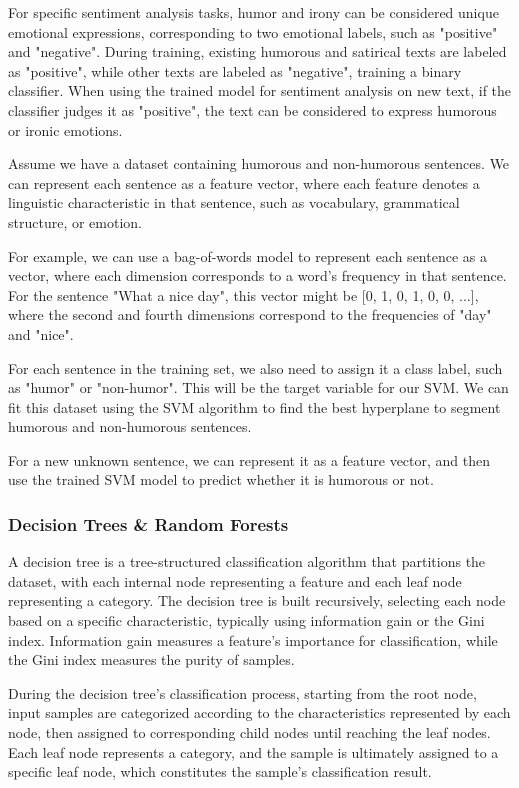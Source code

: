 \documentclass[a4paper]{article}
\begin{document}
For specific sentiment analysis tasks, humor and irony can be considered unique emotional expressions, corresponding to two emotional labels, such as "positive" and "negative". During training, existing humorous and satirical texts are labeled as "positive", while other texts are labeled as "negative", training a binary classifier. When using the trained model for sentiment analysis on new text, if the classifier judges it as "positive", the text can be considered to express humorous or ironic emotions.

Assume we have a dataset containing humorous and non-humorous sentences. We can represent each sentence as a feature vector, where each feature denotes a linguistic characteristic in that sentence, such as vocabulary, grammatical structure, or emotion.

For example, we can use a bag-of-words model to represent each sentence as a vector, where each dimension corresponds to a word's frequency in that sentence. For the sentence "What a nice day", this vector might be [0, 1, 0, 1, 0, 0, ...], where the second and fourth dimensions correspond to the frequencies of "day" and "nice".

For each sentence in the training set, we also need to assign it a class label, such as "humor" or "non-humor". This will be the target variable for our SVM. We can fit this dataset using the SVM algorithm to find the best hyperplane to segment humorous and non-humorous sentences.

For a new unknown sentence, we can represent it as a feature vector, and then use the trained SVM model to predict whether it is humorous or not.

\subsubsection{Decision Trees \& Random Forests}

A decision tree is a tree-structured classification algorithm that partitions the dataset, with each internal node representing a feature and each leaf node representing a category. The decision tree is built recursively, selecting each node based on a specific characteristic, typically using information gain or the Gini index. Information gain measures a feature's importance for classification, while the Gini index measures the purity of samples.

During the decision tree's classification process, starting from the root node, input samples are categorized according to the characteristics represented by each node, then assigned to corresponding child nodes until reaching the leaf nodes. Each leaf node represents a category, and the sample is ultimately assigned to a specific leaf node, which constitutes the sample's classification result.
\end{document}
